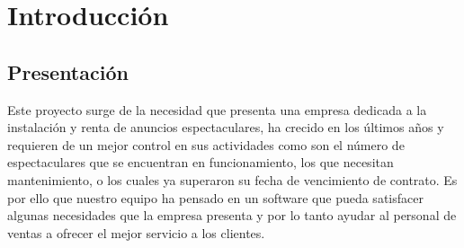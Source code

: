 \chapter{Introducción}
\section{Presentación}
Este proyecto surge de la necesidad que presenta una empresa dedicada a la instalación y renta de anuncios espectaculares, ha crecido en los últimos años y requieren de un mejor control en sus actividades como son el número de espectaculares que se encuentran en funcionamiento, los que necesitan mantenimiento, o los cuales ya superaron su fecha de vencimiento de contrato.
Es por ello que nuestro equipo ha pensado en un software  que pueda satisfacer algunas necesidades que la empresa presenta y por lo tanto ayudar al personal de ventas a ofrecer el mejor servicio a los clientes.


